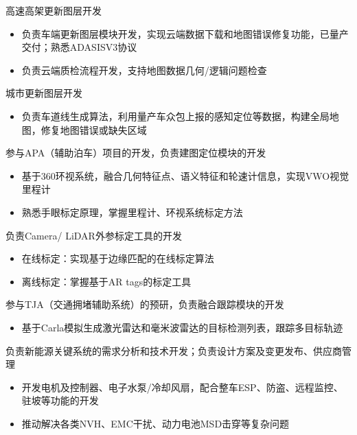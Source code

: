 \documentclass{resume}
\begin{document}
\begin{onehalfspacing}
  高速高架更新图层开发
  \begin{itemize}
    \item {负责车端更新图层模块开发，实现云端数据下载和地图错误修复功能，已量产交付；熟悉ADASISV3协议}
    \item 负责云端质检流程开发，支持地图数据几何/逻辑问题检查
  \end{itemize}

  城市更新图层开发
  \begin{itemize}
    \item 负责车道线生成算法，利用量产车众包上报的感知定位等数据，构建全局地图，修复地图错误或缺失区域
  \end{itemize}
\end{onehalfspacing}

\begin{onehalfspacing}
  参与APA（辅助泊车）项目的开发，负责建图定位模块的开发
  \begin{itemize}
    \item 基于360环视系统，融合几何特征点、语义特征和轮速计信息，实现VWO视觉里程计
    \item 熟悉手眼标定原理，掌握里程计、环视系统标定方法
  \end{itemize}

  负责Camera/ LiDAR外参标定工具的开发
  \begin{itemize}
    \item 在线标定：实现基于边缘匹配的在线标定算法
    \item 离线标定：掌握基于AR tags的标定工具
  \end{itemize}

  参与TJA（交通拥堵辅助系统）的预研，负责融合跟踪模块的开发
  \begin{itemize}
    \item 基于Carla模拟生成激光雷达和毫米波雷达的目标检测列表，跟踪多目标轨迹
  \end{itemize}
\end{onehalfspacing}

负责新能源关键系统的需求分析和技术开发；负责设计方案及变更发布、供应商管理

\begin{onehalfspacing}
  \begin{itemize}
    \item 开发电机及控制器、电子水泵/冷却风扇，配合整车ESP、防盗、远程监控、驻坡等功能的开发
    \item 推动解决各类NVH、EMC干扰、动力电池MSD击穿等复杂问题
  \end{itemize}
\end{onehalfspacing}
\end{document}
